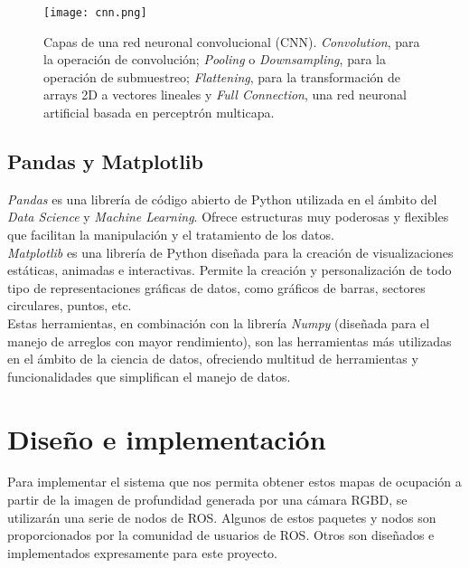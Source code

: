 \begin{figure}[h]
	\begin{center} 
		\texttt{[image: cnn.png]}
	\end{center}
	\caption{Capas de una red neuronal convolucional (CNN). \textit{Convolution}, para la operación de convolución; \textit{Pooling} o \textit{Downsampling}, para la operación de submuestreo;  \textit{Flattening}, para la  transformación de arrays 2D a vectores lineales y \textit{Full Connection}, una red neuronal artificial basada en perceptrón multicapa. \cite{foto_cnn}}
	\label{fig:cnn}
\end{figure}

\section{Pandas y Matplotlib}

\textit{Pandas} es una librería de código abierto de Python utilizada en el ámbito del \textit{Data Science} y \textit{Machine Learning}. Ofrece estructuras muy poderosas y flexibles que facilitan la manipulación y el tratamiento de los datos. \cite{pandas}\\

\textit{Matplotlib} es una librería de Python diseñada para la creación de visualizaciones estáticas, animadas e interactivas. Permite la creación y personalización de todo tipo de representaciones gráficas de datos, como gráficos de barras, sectores circulares, puntos, etc.\cite{matplotlib}\\

Estas herramientas, en combinación con la librería \textit{Numpy} (diseñada para el manejo de arreglos con mayor rendimiento), son las herramientas más utilizadas en el ámbito de la ciencia de datos, ofreciendo multitud de herramientas y funcionalidades que simplifican el manejo de datos.\\



\chapter{Diseño e implementación}

Para implementar el sistema que nos permita obtener estos mapas de ocupación a partir de la imagen de profundidad generada por una cámara RGBD, se utilizarán una serie de nodos de ROS. Algunos de estos paquetes y nodos son proporcionados por la comunidad de usuarios de ROS. Otros son diseñados e implementados expresamente para este proyecto.\\


